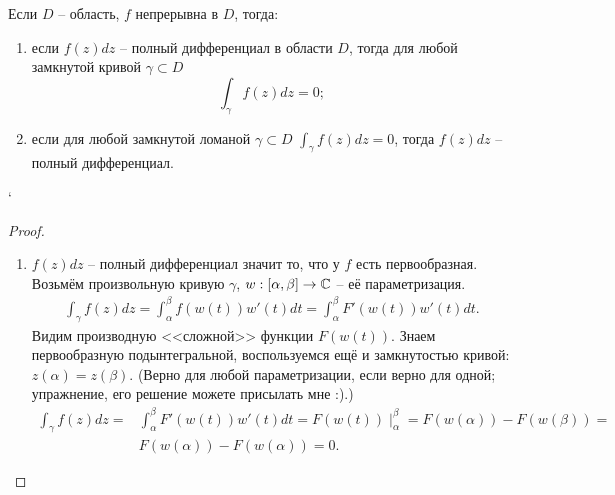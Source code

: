\begin{theorem}
	\label{full_differential_curve_integral_relation}
	Если $D$ -- область, $f$ непрерывна в $D$, тогда:
	\begin{enumerate}[label=(\arabic*)]
		\item если $f(z) dz$ -- полный дифференциал в области $D$, тогда для любой замкнутой кривой $\gamma \subset D$
		\[
			\int_\gamma f(z) dz = 0;
		\]
		\item если для любой замкнутой ломаной $\gamma \subset D$ $\int_\gamma f(z) dz = 0$, тогда $f(z) dz$ -- полный дифференциал.
	\end{enumerate}`
\end{theorem}
\begin{proof} \hfil
	\begin{enumerate}
		\item $f(z) dz$ -- полный дифференциал значит то, что у $f$ есть первообразная. Возьмём произвольную кривую $\gamma$, $w: [\alpha, \beta] \to \mathbb{C}$ -- её параметризация.
			\begin{align*}
				\int_\gamma f(z) dz = \int_\alpha^\beta f(w(t)) w'(t) dt = \int_\alpha^\beta F'(w(t)) w'(t) dt.
			\end{align*}
		Видим производную <<сложной>> функции $F(w(t))$. Знаем первообразную подынтегральной, воспользуемся ещё и замкнутостью кривой: $z(\alpha) = z(\beta)$. (Верно для любой параметризации, если верно для одной; упражнение, его решение можете присылать мне :).)
		\begin{align*}
			\int_\gamma f(z) dz = & \int_\alpha^\beta F'(w(t)) w'(t) dt = F(w(t)) \mid_\alpha^\beta = F(w(\alpha)) - F(w(\beta)) = \\
			& F(w(\alpha)) - F(w(\alpha)) = 0.
		\end{align*}
	

\end{enumerate}
\end{proof}
